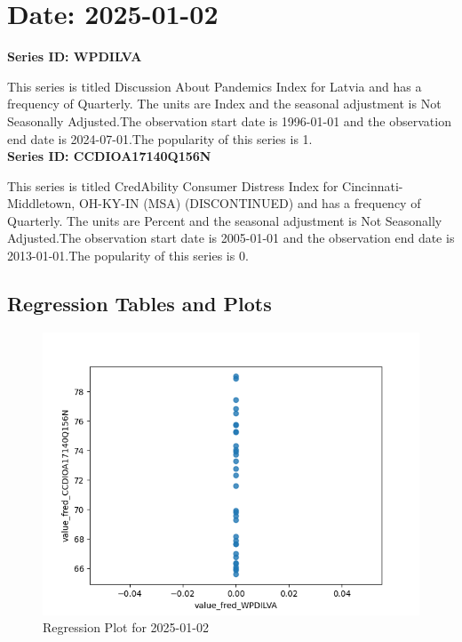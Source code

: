 \section{Date: 2025-01-02}
\noindent \textbf{Series ID: WPDILVA} 

\noindent This series is titled Discussion About Pandemics Index for Latvia and has a frequency of Quarterly. The units are Index and the seasonal adjustment is Not Seasonally Adjusted.The observation start date is 1996-01-01 and the observation end date is 2024-07-01.The popularity of this series is 1. \\ 

\noindent \textbf{Series ID: CCDIOA17140Q156N} 

\noindent This series is titled CredAbility Consumer Distress Index for Cincinnati-Middletown, OH-KY-IN (MSA) (DISCONTINUED) and has a frequency of Quarterly. The units are Percent and the seasonal adjustment is Not Seasonally Adjusted.The observation start date is 2005-01-01 and the observation end date is 2013-01-01.The popularity of this series is 0. \\ 

\subsection{Regression Tables and Plots}


\begin{figure}
\centering
\includegraphics[scale = 0.9]{plots/plot_2025-01-02.png}
\caption{Regression Plot for 2025-01-02}
\end{figure}
\newpage
